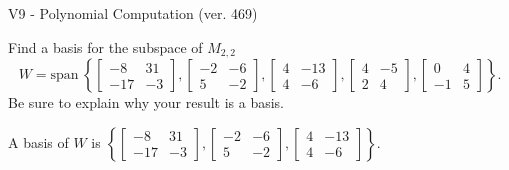 \begin{exercise}
  \begin{exerciseTitle}V9 - Polynomial Computation (ver. 469)\end{exerciseTitle}
  \begin{exerciseStatement}
    Find a basis for the subspace of \(M_{2,2}\) 
\[W=\mathrm{span}\ \left\{\left[\begin{array}{cc}
-8 & 31 \\
-17 & -3
\end{array}\right] , \left[\begin{array}{cc}
-2 & -6 \\
5 & -2
\end{array}\right] , \left[\begin{array}{cc}
4 & -13 \\
4 & -6
\end{array}\right] , \left[\begin{array}{cc}
4 & -5 \\
2 & 4
\end{array}\right] , \left[\begin{array}{cc}
0 & 4 \\
-1 & 5
\end{array}\right]\right\}.\]
 Be sure to explain why your result is a basis.


  \end{exerciseStatement}
  \begin{exerciseAnswer}
   A basis of \(W\) is  \(\left\{\left[\begin{array}{cc}
-8 & 31 \\
-17 & -3
\end{array}\right] , \left[\begin{array}{cc}
-2 & -6 \\
5 & -2
\end{array}\right] , \left[\begin{array}{cc}
4 & -13 \\
4 & -6
\end{array}\right]\right\}\).
  


  \end{exerciseAnswer}
\end{exercise}